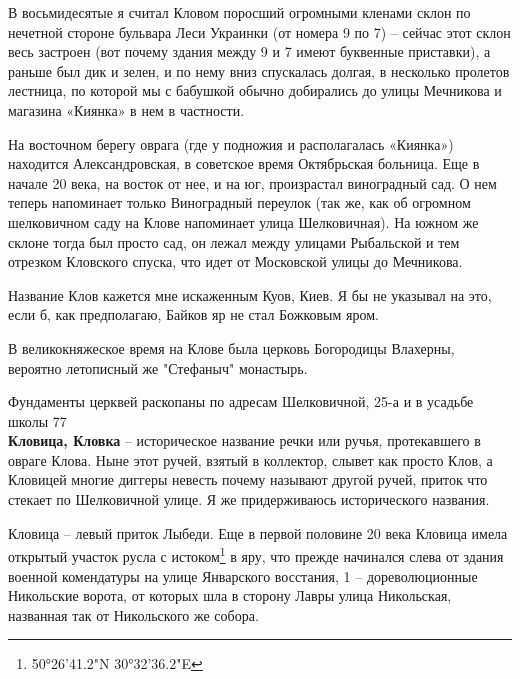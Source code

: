 
В восьмидесятые я считал Кловом поросший огромными кленами склон по нечетной стороне бульвара Леси Украинки (от номера 9 по 7) – сейчас этот склон весь застроен (вот почему здания между 9 и 7 имеют буквенные приставки), а раньше был дик и зелен, и по нему вниз спускалась долгая, в несколько пролетов лестница, по которой мы с бабушкой обычно добирались до улицы Мечникова и магазина «Киянка» в нем в частности.

На восточном берегу оврага (где у подножия и располагалась «Киянка») находится Александровская, в советское время Октябрьская больница. Еще в начале 20 века, на восток от нее, и на юг, произрастал виноградный сад. О нем теперь напоминает только Виноградный переулок (так же, как об огромном шелковичном саду на Клове напоминает улица Шелковичная). На южном же склоне тогда был просто сад, он лежал между улицами Рыбальской и тем отрезком Кловского спуска, что идет от Московской улицы до Мечникова.

Название Клов кажется мне искаженным Куов, Киев. Я бы не указывал на это, если б, как предполагаю, Байков яр не стал Божковым яром.

В великокняжеское время на Клове была церковь Богородицы Влахерны, вероятно летописный же "Стефаныч" монастырь. 

Фундаменты церквей раскопаны по адресам Шелковичной, 25-а и в усадьбе школы 77
\\ 

\textbf{Кловица, Кловка} – историческое название речки или ручья, протекавшего в овраге Клова. Ныне этот ручей, взятый в коллектор, слывет как просто Клов, а Кловицей многие диггеры невесть почему называют другой ручей, приток что стекает по Шелковичной улице. Я же придерживаюсь исторического названия.

Кловица – левый приток Лыбеди. Еще в первой половине 20 века Кловица имела открытый участок русла с истоком\footnote{50°26'41.2"N 30°32'36.2"E} в яру, что прежде начинался слева от здания военной комендатуры на улице Январского восстания, 1 – дореволюционные Никольские ворота, от которых шла в сторону Лавры улица Никольская, названная так от Никольского же собора.

